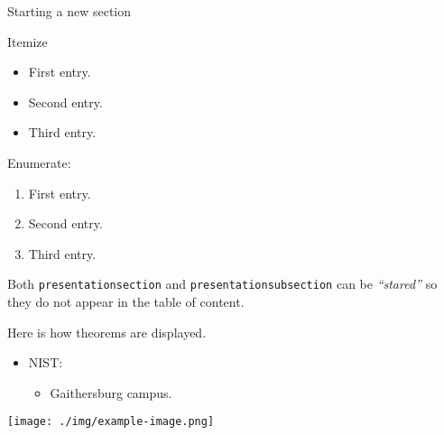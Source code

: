 
\begin{sectionslide}
  Starting a new section
\end{sectionslide}


\begin{subsectionslide}
  Itemize

  \begin{itemize}
    \item First entry.
    \item Second entry.
    \item Third entry.
  \end{itemize}

  Enumerate:

  \begin{enumerate}
    \item First entry.
    \item Second entry.
    \item Third entry.
  \end{enumerate}
\end{subsectionslide}


\begin{subsectionslide}
  Both \texttt{presentationsection} and \texttt{presentationsubsection} can
  be \textit{``stared''} so they do not appear in the table of content.
\end{subsectionslide}


\begin{subsectionslide}
  \begin{theorem}[Example]
    Here is how theorems are displayed.
  \end{theorem}
\end{subsectionslide}


\begin{subsectionslide}
  \begin{minipage}[h!]{0.45\textwidth}
    \begin{itemize}
      \item NIST:
      \begin{itemize}
        \item Gaithersburg campus.
      \end{itemize}
    \end{itemize}
  \end{minipage}\hfill
  \begin{minipage}[h!]{0.45\textwidth}
    \texttt{[image: ./img/example-image.png]}
  \end{minipage}
\end{subsectionslide}

